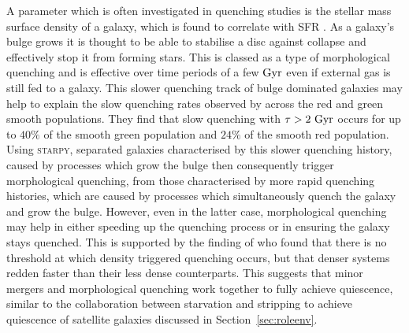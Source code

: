 \documentclass[useAMS,usenatbib]{mn2e}
\begin{document}

A parameter which is often investigated in quenching studies is the stellar mass surface density of a galaxy, which is found to correlate with SFR \citep{barro13b, whitaker16}. As a galaxy's bulge grows it is thought to be able to stabilise a disc against collapse and effectively stop it from forming stars. This is classed as a type of morphological quenching and is effective over time periods of a few $\rm{Gyr}$ \citep{Fang13} even if external gas is still fed to a galaxy. This slower quenching track of bulge dominated galaxies may help to explain the slow quenching rates observed by \cite{smethurst15} across the red and green smooth populations. They find that slow quenching with $\tau>2~\rm{Gyr}$ occurs for up to $40\%$ of the smooth green population and $24\%$ of the smooth red population. Using \textsc{starpy}, \cite{smethurst15} separated galaxies characterised by this slower quenching history, caused by processes which grow the bulge then consequently trigger morphological quenching, from those characterised by more rapid quenching histories, which are caused by processes which simultaneously quench the galaxy and grow the bulge. However, even in the latter case, morphological quenching may help in either speeding up the quenching process or in ensuring the galaxy stays quenched. This is supported by the finding of \cite{abramson16} who found that there is no threshold at which density triggered quenching occurs, but that denser systems redden faster than their less dense counterparts. This suggests that minor mergers and morphological quenching work together to fully achieve quiescence, similar to the collaboration between starvation and stripping to achieve quiescence of satellite galaxies discussed in Section~\ref{sec:roleenv}. 
\end{document}
